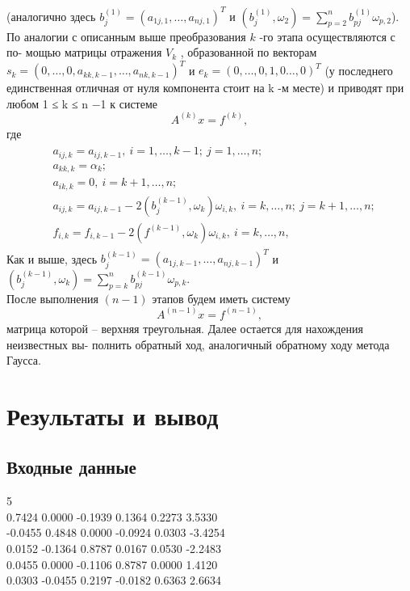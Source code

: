 \documentclass[11.4pt]{article}
\begin{document}
(аналогично здесь $b_j^{(1)}=(a_{1j,1},\ldots, a_{nj,1})^T$ и $(b_j^{(1)}, \omega_2)=\sum\limits_{p=2}^n b_{pj}^{(1)} \omega_{p,2}$).\\
По аналогии с описанным выше преобразования $k$ -го этапа осуществляются с по-
мощью матрицы отражения $V_k$ , образованной по векторам  $s_k=(0,\ldots,0, a_{kk,k-1},\ldots,a_{nk,k-1})^T$  и
$e_k=(0,\ldots,0,1,0\ldots, 0)^T$ (у последнего единственная отличная от нуля компонента стоит на
k -м месте) и приводят при любом 1 ≤ k ≤ n −1 к системе
\begin{equation}
	A^{(k)}x=f^{(k)},
\end{equation}
где
\begin{align}
		\begin{split}
		&a_{ij, k} = a_{ij, k-1}, \: i=1,\ldots,k-1; \: j=1,\ldots,n;\\
		&a_{kk,k} = \alpha_k; \\
		&a_{ik,k} = 0, \: i=k+1,\ldots,n;\\
		&a_{ij, k} = a_{ij, k-1} -2(b_j^{(k-1)},\omega_k)\omega_{i, k}, \: i = k,\ldots,n; \: j=k+1,\ldots,n;\\
		&f_{i,k} = f_{i,k - 1} - 2(f^{(k -1)},\omega_k)\omega_{i,k},\: i = k,\ldots,n,
		\end{split}		
\end{align}
Как и выше, здесь $b_j^{(k-1)}=(a_{1j,k-1},\ldots, a_{nj,k-1})^T$ и  $(b_j^{(k-1)}, \omega_k)=\sum\limits_{p=k}^n b_{pj}^{(k-1)} \omega_{p,k}$.\\
После выполнения $(n-1)$ этапов будем иметь систему
\[A^{(n-1)}x=f^{(n-1)},\]
матрица которой – верхняя треугольная. Далее остается для нахождения неизвестных вы-
полнить обратный ход, аналогичный обратному ходу метода Гаусса. 
\section{Результаты и вывод}
	\subsection{Входные данные}
		5\\
		0.7424 0.0000 -0.1939 0.1364 0.2273 3.5330\\
		-0.0455 0.4848 0.0000 -0.0924 0.0303 -3.4254\\
		0.0152 -0.1364 0.8787 0.0167 0.0530 -2.2483\\
		0.0455 0.0000 -0.1106 0.8787 0.0000 1.4120\\
		0.0303 -0.0455 0.2197 -0.0182 0.6363 2.6634\\
\end{document}
